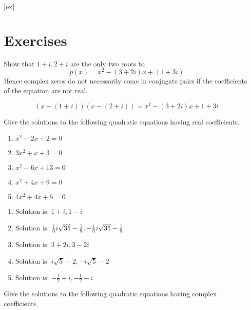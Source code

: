 [ex]
\section*{Exercises}

\begin{enumialphparenastyle}

\begin{ex} Show that $1+i,2+i$ are the only two roots to
\begin{equation*}
p\left( x\right) =x^{2}-\left( 3+2i\right) x+\left( 1+3i\right)
\end{equation*}
Hence complex zeros do not necessarily come in conjugate pairs if the coefficients of the equation
are not real. 
\begin{sol}
\[
\left( x-\left( 1+i\right) \right) \left( x-\left( 2+i\right) \right)
= x^{2}-\left( 3+2i\right) x+1+3i
\]
\end{sol}
\end{ex}

\begin{ex} Give the solutions to the following quadratic equations having real
coefficients.

\begin{enumerate}
\item $x^{2}-2x+2=0$

\item $3x^{2}+x+3=0$

\item $x^{2}-6x+13=0$

\item $x^{2}+4x+9=0$

\item $4x^{2}+4x+5=0$
\end{enumerate}
\begin{sol}
\begin{enumerate}
\item Solution is: $1+i,1-i$
\item Solution is: $\frac{1}{6}i\sqrt{35}-\frac{1}{6},-\frac{%
1}{6}i\sqrt{35}-\frac{1}{6}$
\item Solution is: $3+2i,3-2i$
\item Solution is: $i\sqrt{5}-2,-i\sqrt{5}-2$
\item Solution is: $-\frac{1}{2}+i,-\frac{1}{2}-i$
\end{enumerate}
\end{sol}
\end{ex}


\begin{ex} Give the solutions to the following quadratic equations having complex
coefficients.


\end{ex}
\end{enumialphparenastyle}
